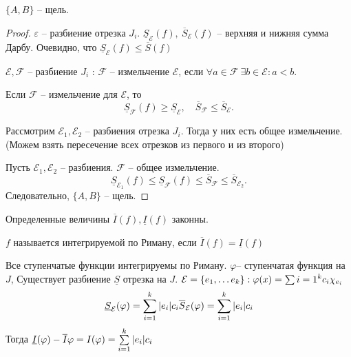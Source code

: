 \documentclass[12pt]{report}
\begin{document}
\begin{st}
    $\{A, B\}$ -- щель.
\end{st}
\begin{proof}
    $ \varepsilon $ -- разбиение отрезка $ J_i$.
    $ \underline{S}_{ \mathcal{E} } (f) , ~ \overline{S} _{ \mathcal{E} }(f)$ -- верхняя и нижняя сумма Дарбу.
    Очевидно, что $ \underline{S} _ \mathcal{E}  (f) \le  \overline{S} (f)$

    $ \mathcal{E} , \mathcal{F}$ -- разбиение  $ J_i$ : $ \mathcal{F}$ -- измельчение $ \mathcal{E} $, если $ \forall  a \in  \mathcal{F} ~ \exists  b \in  \mathcal{E} : a<b$.
    \begin{lm}
        Если $ \mathcal{F}$ -- измельчение для $ \mathcal{E} $, то \[
	    \underline{S} _\mathcal{F} (f) \ge \underline{S}_ \mathcal{E} , \quad \overline{S}_\mathcal{F} \le \overline{S}_ \mathcal{E} 
        .\] 
    \end{lm}
    \begin{lm}
    Рассмотрим  $ \mathcal{E}_1, \mathcal{E}_2$ -- разбиения отрезка $ J_i$.
    Тогда у них есть общее измельчение. (Можем взять пересечение всех отрезков из первого и из второго)
    \end{lm}
    Пусть $ \mathcal{E}_1, \mathcal{E}_2$ -- разбиения. $ \mathcal{F}$ -- общее измельчение.
    \[
	\underline{S}_{\mathcal{E}_1} (f) \le  \underline{S}_{\mathcal{F}} (f) \le \overline{S}_\mathcal{F} \le \overline{S}_{\mathcal{E}_2}
    .\] 
    Следовательно, $ \{A, B\}$ -- щель.
\end{proof}
\begin{note}
    Определенные величины $ \overline{I}(f) , \underline{I}(f)$ законны.
\end{note}
\begin{defn}
    $ f$ называется интегрируемой по Риману, если $ \overline{I}(f) = \underline{I}(f)$
\end{defn}
\begin{ex}
        \item Все ступенчатые функции интегрируемы по Риману.
	     $\varphi $-- ступенчатая функция на $ J$, 
	     Существует разбиение $ \underline{S}$ отрезка на $ J$.
	     $ \mathcal{E} = \{e_1, \ldots  e_k\} : \varphi  (x) = \sum\limits{i=1}^{k} c_i \chi_{e_i}$
	     \[
		 \underline{S}_{\mathcal{E}}( \varphi ) = \sum\limits_{i=1}^{k} |e_i| c_i 
		 \overline{S}_{\mathcal{E}}( \varphi ) = \sum\limits_{i=1}^{k} |e_i| c_i 
	     \] 
	     Тогда $ \underline{I} ( \varphi ) - \overline{I} \varphi = I( \varphi ) = \sum\limits_{i=1}^{k} |e_i| c_i$ 
\end{ex}
\end{document}
